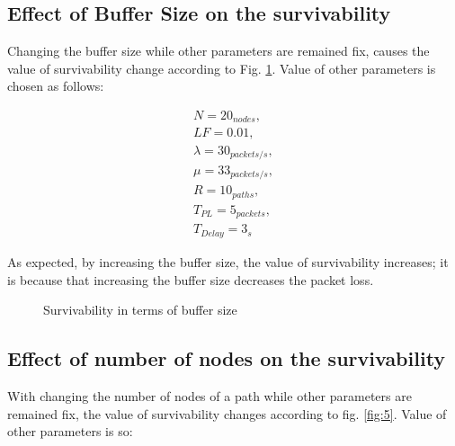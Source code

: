 \documentclass[onecolumn,conference]{IEEEtran}
\begin{document}
    \subsection{Effect of Buffer Size on the survivability}
    Changing the buffer size while other parameters are remained fix, causes the value of survivability change according to Fig. \ref{fig:4}. Value of other parameters is chosen as follows:

    \begin{equation}
        \begin{split}
            N=20_{nodes},\\
            LF=0.01,\\
            \lambda=30_{packets/s},\\
            \mu=33_{packets/s},\\
            R=10_{paths},\\
            T_{PL}=5_{packets},\\
            T_{Delay}=3_s
        \end{split}
    \end{equation}

    As expected, by increasing the buffer size, the value of survivability increases; it is because that increasing the buffer size decreases the packet loss.

    \begin{figure}[htbp]
        \centering
        \caption{Survivability in terms of buffer size}
        \label{fig:4}
    \end{figure}

    \subsection{Effect of number of nodes on the survivability}
    With changing the number of nodes of a path while other parameters are remained fix, the value of survivability changes according to fig. \ref{fig:5}. Value of other parameters is so:
\end{document}
